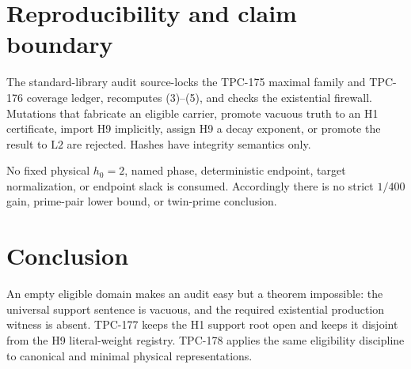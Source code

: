 \documentclass[11pt]{article}
\theoremstyle{definition}
\theoremstyle{remark}
\newcommand{\Ltwo}{\mathrm{L2}}
\begin{document}
\section{Reproducibility and claim boundary}

The standard-library audit source-locks the TPC-175 maximal family
and TPC-176 coverage ledger, recomputes (3)--(5), and checks the
existential firewall.  Mutations that fabricate an eligible carrier,
promote vacuous truth to an H1 certificate, import H9 implicitly,
assign H9 a decay exponent, or promote the result to \(\Ltwo\) are
rejected.  Hashes have integrity semantics only.

No fixed physical \(h_0=2\), named phase, deterministic endpoint,
target normalization, or endpoint slack is consumed.  Accordingly
there is no strict \(1/400\) gain, prime-pair lower bound, or
twin-prime conclusion.

\section{Conclusion}

An empty eligible domain makes an audit easy but a theorem
impossible: the universal support sentence is vacuous, and the
required existential production witness is absent.  TPC-177 keeps
the H1 support root open and keeps it disjoint from the H9
literal-weight registry.  TPC-178 applies the same eligibility
discipline to canonical and minimal physical representations.

\nocite{*}


\end{document}

